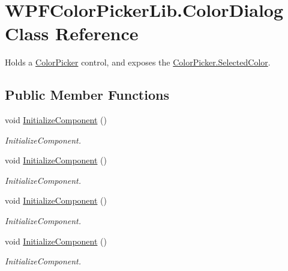 \hypertarget{class_w_p_f_color_picker_lib_1_1_color_dialog}{
\section{WPFColorPickerLib.ColorDialog Class Reference}
\label{class_w_p_f_color_picker_lib_1_1_color_dialog}
}


Holds a \hyperlink{class_w_p_f_color_picker_lib_1_1_color_picker}{ColorPicker} control, and exposes the \hyperlink{class_w_p_f_color_picker_lib_1_1_color_picker_a0507e30a334f6bdff5b4b7533a4d1689}{ColorPicker.SelectedColor}.  


\subsection*{Public Member Functions}
\begin{DoxyCompactItemize}
\item 
void \hyperlink{class_w_p_f_color_picker_lib_1_1_color_dialog_aafff11d2b33cffceee9976fe49468702}{InitializeComponent} ()
\begin{DoxyCompactList}\small\item\em InitializeComponent. \item\end{DoxyCompactList}\item 
void \hyperlink{class_w_p_f_color_picker_lib_1_1_color_dialog_aafff11d2b33cffceee9976fe49468702}{InitializeComponent} ()
\begin{DoxyCompactList}\small\item\em InitializeComponent. \item\end{DoxyCompactList}\item 
void \hyperlink{class_w_p_f_color_picker_lib_1_1_color_dialog_aafff11d2b33cffceee9976fe49468702}{InitializeComponent} ()
\begin{DoxyCompactList}\small\item\em InitializeComponent. \item\end{DoxyCompactList}\item 
void \hyperlink{class_w_p_f_color_picker_lib_1_1_color_dialog_aafff11d2b33cffceee9976fe49468702}{InitializeComponent} ()
\begin{DoxyCompactList}\small\item\em InitializeComponent. \item\end{DoxyCompactList}\end{DoxyCompactItemize}
